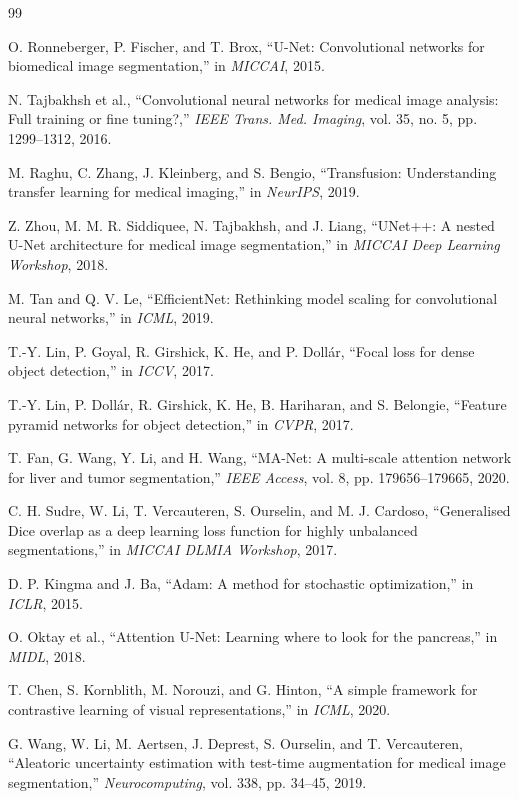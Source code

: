 \documentclass[11pt,a4paper]{article}
\begin{document}

\begin{thebibliography}{99}

O. Ronneberger, P. Fischer, and T. Brox,
``U-Net: Convolutional networks for biomedical image segmentation,''
in \textit{MICCAI}, 2015.

N. Tajbakhsh et al.,
``Convolutional neural networks for medical image analysis: Full training or fine tuning?,''
\textit{IEEE Trans. Med. Imaging}, vol. 35, no. 5, pp. 1299--1312, 2016.

M. Raghu, C. Zhang, J. Kleinberg, and S. Bengio,
``Transfusion: Understanding transfer learning for medical imaging,''
in \textit{NeurIPS}, 2019.

Z. Zhou, M. M. R. Siddiquee, N. Tajbakhsh, and J. Liang,
``UNet++: A nested U-Net architecture for medical image segmentation,''
in \textit{MICCAI Deep Learning Workshop}, 2018.

M. Tan and Q. V. Le,
``EfficientNet: Rethinking model scaling for convolutional neural networks,''
in \textit{ICML}, 2019.

T.-Y. Lin, P. Goyal, R. Girshick, K. He, and P. Dollár,
``Focal loss for dense object detection,''
in \textit{ICCV}, 2017.

T.-Y. Lin, P. Dollár, R. Girshick, K. He, B. Hariharan, and S. Belongie,
``Feature pyramid networks for object detection,''
in \textit{CVPR}, 2017.

T. Fan, G. Wang, Y. Li, and H. Wang,
``MA-Net: A multi-scale attention network for liver and tumor segmentation,''
\textit{IEEE Access}, vol. 8, pp. 179656--179665, 2020.

C. H. Sudre, W. Li, T. Vercauteren, S. Ourselin, and M. J. Cardoso,
``Generalised Dice overlap as a deep learning loss function for highly unbalanced segmentations,''
in \textit{MICCAI DLMIA Workshop}, 2017.

D. P. Kingma and J. Ba,
``Adam: A method for stochastic optimization,''
in \textit{ICLR}, 2015.

O. Oktay et al.,
``Attention U-Net: Learning where to look for the pancreas,''
in \textit{MIDL}, 2018.

T. Chen, S. Kornblith, M. Norouzi, and G. Hinton,
``A simple framework for contrastive learning of visual representations,''
in \textit{ICML}, 2020.

G. Wang, W. Li, M. Aertsen, J. Deprest, S. Ourselin, and T. Vercauteren,
``Aleatoric uncertainty estimation with test-time augmentation for medical image segmentation,''
\textit{Neurocomputing}, vol. 338, pp. 34--45, 2019.

\end{thebibliography}
\end{document}
